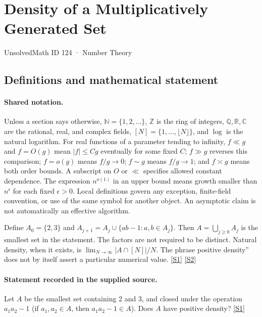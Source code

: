 \documentclass[11pt,a4paper]{article}
\newcommand{\N}{\mathbb{N}}
\newcommand{\Z}{\mathbb{Z}}
\newcommand{\Q}{\mathbb{Q}}
\newcommand{\R}{\mathbb{R}}
\newcommand{\C}{\mathbb{C}}
\newcommand{\sref}[2]{\hyperlink{source:#1:#2}{[S#2]}}
\begin{document}

\setcounter{section}{123}

\section{Density of a Multiplicatively Generated Set}\label{124}

{\small\sffamily UnsolvedMath ID 124 · Number Theory}

\subsection{Definitions and mathematical statement}

\paragraph{Shared notation.}Unless a section says otherwise, $\N=\{1,2,\ldots\}$,
$\Z$ is the ring of integers, $\Q,\R,\C$ are the rational, real, and complex
fields, $[N]=\{1,\ldots,\lfloor N\rfloor\}$, and $\log$ is the natural
logarithm. For real functions of a parameter tending to infinity,
$f\ll g$ and $f=O(g)$ mean $|f|\leq Cg$ eventually for some fixed $C$;
$f\gg g$ reverses this comparison; $f=o(g)$ means $f/g\to0$;
$f\sim g$ means $f/g\to1$; and $f\asymp g$ means both order bounds.
A subscript on $O$ or $\ll$ specifies allowed constant dependence.
The expression $n^{o(1)}$ in an upper bound means growth smaller than
$n^\epsilon$ for each fixed $\epsilon>0$. Local definitions govern any
exception, finite-field convention, or use of the same symbol for another
object. An asymptotic claim is not automatically an effective algorithm.



Define $A_0=\{2,3\}$ and $A_{j+1}=A_j\cup\{ab-1:a,b\in A_j\}$. Then $A=\bigcup_{j\geq0}A_j$ is the smallest set in the statement. The factors are not required to be distinct. Natural density, when it exists, is $\lim_{N\to\infty}|A\cap[N]|/N$. The phrase positive density'' does not by itself assert a particular numerical value. \sref{124}{1} \sref{124}{2}

\paragraph{Statement recorded in the supplied source.}
Let $A$ be the smallest set containing 2 and 3, and closed under the operation $a_1a_2 - 1$ (if $a_1, a_2 \in A$, then $a_1a_2 - 1 \in A$). Does $A$ have positive density? \sref{124}{1}
\end{document}
